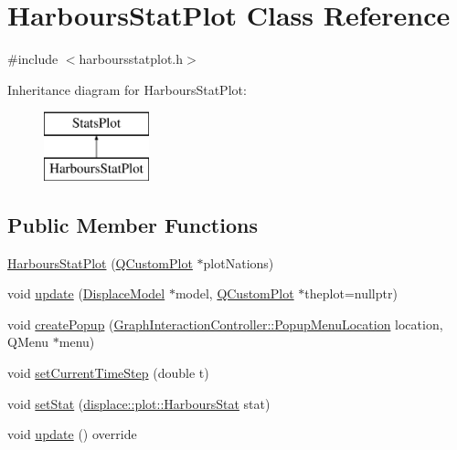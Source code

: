 \hypertarget{class_harbours_stat_plot}{}\section{Harbours\+Stat\+Plot Class Reference}
\label{class_harbours_stat_plot}


{\ttfamily \#include $<$harboursstatplot.\+h$>$}

Inheritance diagram for Harbours\+Stat\+Plot\+:\begin{figure}[H]
\begin{center}
\leavevmode
\includegraphics[height=2.000000cm]{d6/da0/class_harbours_stat_plot}
\end{center}
\end{figure}
\subsection*{Public Member Functions}
\begin{DoxyCompactItemize}
\item 
\mbox{\hyperlink{class_harbours_stat_plot_a5aa6a577b9530af1423e334f9d035297}{Harbours\+Stat\+Plot}} (\mbox{\hyperlink{class_q_custom_plot}{Q\+Custom\+Plot}} $\ast$plot\+Nations)
\item 
void \mbox{\hyperlink{class_harbours_stat_plot_ad75641b6f29ff3a585c3c47af2c4e758}{update}} (\mbox{\hyperlink{class_displace_model}{Displace\+Model}} $\ast$model, \mbox{\hyperlink{class_q_custom_plot}{Q\+Custom\+Plot}} $\ast$theplot=nullptr)
\item 
void \mbox{\hyperlink{class_harbours_stat_plot_a387865c6c454d4f9e14d4a99aacd55fb}{create\+Popup}} (\mbox{\hyperlink{class_graph_interaction_controller_a67e6eba082927bf2b984bed54fe32764}{Graph\+Interaction\+Controller\+::\+Popup\+Menu\+Location}} location, Q\+Menu $\ast$menu)
\item 
void \mbox{\hyperlink{class_harbours_stat_plot_a0c8503ac831e76d77b8ea5938b7f57ca}{set\+Current\+Time\+Step}} (double t)
\item 
void \mbox{\hyperlink{class_harbours_stat_plot_aac701be8c6460dd3e7b6b90b9afa6ff3}{set\+Stat}} (\mbox{\hyperlink{namespacedisplace_1_1plot_a006fcde9bb7e602d977226ff75cb67aa}{displace\+::plot\+::\+Harbours\+Stat}} stat)
\item 
void \mbox{\hyperlink{class_harbours_stat_plot_a98ae9cd6fbf5089f6fc7edabf2912606}{update}} () override
\end{DoxyCompactItemize}
